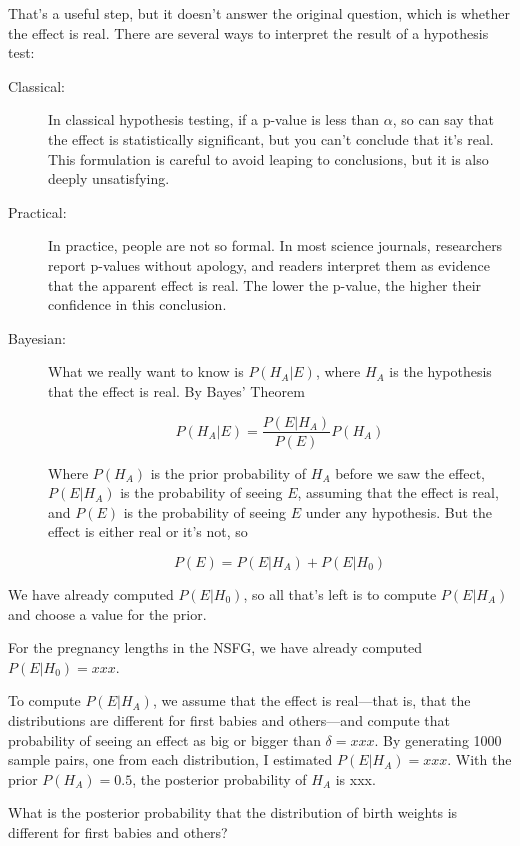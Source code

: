 \documentclass[10pt]{book}
\begin{document}
That's a useful step, but it doesn't answer the original question,
which is whether the effect is real.  There are several ways to
interpret the result of a hypothesis test:

\begin{description}

\item[Classical:] In classical hypothesis testing, if a p-value
  is less than $\alpha$, so can say that the effect is statistically
  significant, but you can't conclude that it's real.  This
  formulation is careful to avoid leaping to conclusions, but it is
  also deeply unsatisfying.

\item[Practical:] In practice, people are not so formal.  In most
  science journals, researchers report p-values without apology, and
  readers interpret them as evidence that the apparent effect is real.
  The lower the p-value, the higher their confidence in this
  conclusion.

\item[Bayesian:] What we really want to know is $P(H_A | E)$, where
  $H_A$ is the hypothesis that the effect is real.  By Bayes' Theorem

  \[ P(H_A | E) = \frac{P(E | H_A)}{P(E)} P(H_A) \]

  Where $P(H_A)$ is the prior probability of $H_A$ before we saw the
  effect, $P(E | H_A)$ is the probability of seeing $E$, assuming that
  the effect is real, and $P(E)$ is the probability of seeing $E$
  under any hypothesis.  But the effect is either real or it's not, so 

  \[ P(E) = P(E | H_A) + P(E | H_0) \]

\end{description}

We have already computed $P(E | H_0)$, so all that's left is to compute
$P(E | H_A)$ and choose a value for the prior.

For the pregnancy lengths in the NSFG, we have already
computed $P(E | H_0) = xxx$.

To compute $P(E | H_A)$, we assume that the effect is real---that is,
that the distributions are different for first babies and others---and
compute that probability of seeing an effect as big or bigger than
$\delta = xxx$.  By generating 1000 sample pairs, one from each
distribution, I estimated $P(E | H_A) = xxx$.  With the prior
$P(H_A)=0.5$, the posterior probability of $H_A$ is xxx.

\begin{ex}

What is the posterior probability that the distribution of birth
weights is different for first babies and others?

\end{ex}
\end{document}
